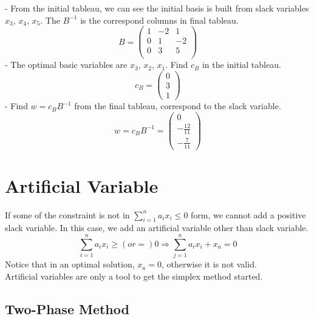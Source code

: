 				- From the initial tableau, we can see the initial basis is built from slack variables $x_3$, $x_4$, $x_5$. The $B^{-1}$ is the correspond columns in final tableau.
				\begin{equation}
					B = \left(\begin{matrix}
						1 & -2 & 1\\
						0 & 1 & -2\\
						0 & 3 & 5\\
					\end{matrix}\right) 		
				\end{equation}
				- The optimal basic variables are $x_3$, $x_2$, $x_1$. Find $c_B$ in the initial tableau.
				\begin{equation}
					c_B = \left(\begin{matrix}
						0\\3\\1
					\end{matrix}\right) 
				\end{equation}
				- Find $w=c_BB^{-1}$ from the final tableau, correspond to the slack variable.
				\begin{equation}
					w = c_BB^{-1} = \left(\begin{matrix}
						0\\-\frac{12}{11}\\-\frac7{11}
					\end{matrix}\right) 
				\end{equation}

		\section{Artificial Variable}
			If some of the constraint is not in $\sum_{i=1}^na_ix_i \le 0$ form, we cannot add a positive slack variable. In this case, we add an artificial variable other than slack variable.
			\begin{equation}
				\sum_{i=1}^n a_ix_i \ge (or =) 0 \Rightarrow \sum_{j=1}^n a_ix_i + x_a = 0 
			\end{equation}
			Notice that in an optimal solution, $x_a = 0$, otherwise it is not valid.\\
			Artificial variables are only a tool to get the simplex method started.
			\subsection{Two-Phase Method}
